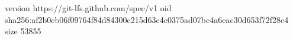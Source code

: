 version https://git-lfs.github.com/spec/v1
oid sha256:af2b0cb06f09764f84d84300e215d63c4c0375ad07bc4a6cac30d653f72f28c4
size 53855
